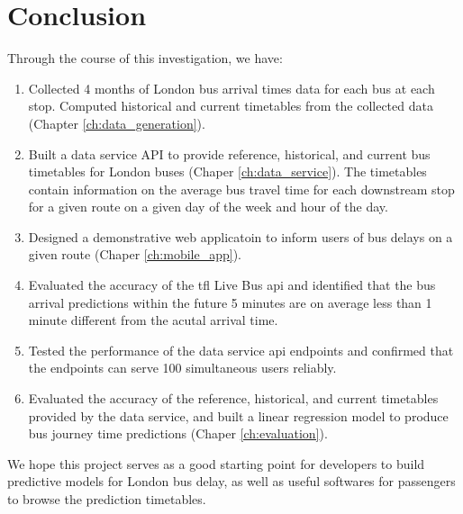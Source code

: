 









\chapter{Conclusion}
\par Through the course of this investigation, we have:

\begin{enumerate}
  \item Collected 4 months of London bus arrival times data for each bus at each stop. Computed historical and current timetables from the collected data (Chapter \ref{ch:data_generation}).
  \item Built a data service API to provide reference, historical, and current bus timetables for London buses (Chaper \ref{ch:data_service}). The timetables contain information on the average bus travel time for each downstream stop for a given route on a given day of the week and hour of the day.
  \item Designed a demonstrative web applicatoin to inform users of bus delays on a given route (Chaper \ref{ch:mobile_app}).
  \item Evaluated the accuracy of the \acrshort{tfl} Live Bus \acrshort{api} and identified that the bus arrival predictions within the future 5 minutes are on average less than 1 minute different from the acutal arrival time.
  \item Tested the performance of the data service \acrshort{api} endpoints and confirmed that the endpoints can serve 100 simultaneous users reliably.
  \item Evaluated the accuracy of the reference, historical, and current timetables provided by the data service, and built a linear regression model to produce bus journey time predictions (Chaper \ref{ch:evaluation}).
\end{enumerate}

\par We hope this project serves as a good starting point for developers to build predictive models for London bus delay, as well as useful softwares for passengers to browse the prediction timetables.
